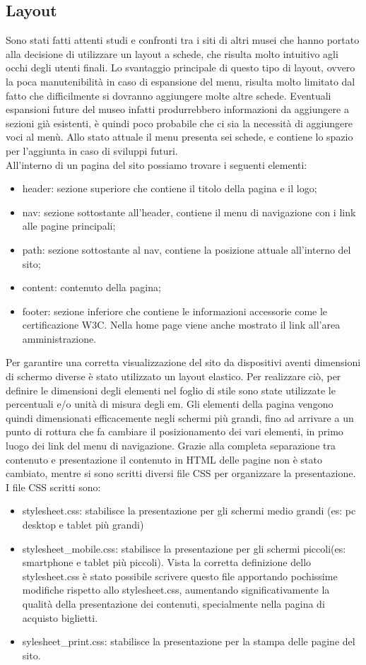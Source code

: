 \documentclass[10pt,a4paper,onecolumn]{article}
\begin{document}
\subsection{Layout}
Sono stati fatti attenti studi e confronti tra i siti di altri musei che hanno portato alla decisione di utilizzare un layout a schede, che risulta molto intuitivo agli occhi degli utenti finali. Lo svantaggio principale di questo tipo di layout, ovvero la poca manutenibilità in caso di espansione del menu, risulta molto limitato dal fatto che difficilmente si dovranno aggiungere molte altre schede. Eventuali espansioni future del museo infatti produrrebbero informazioni da aggiungere a sezioni già esistenti, è quindi poco probabile che ci sia la necessità di aggiungere voci al menù. Allo stato attuale il menu presenta sei schede, e contiene lo spazio per l'aggiunta in caso di sviluppi futuri.\\
All'interno di un pagina del sito possiamo trovare i seguenti elementi:
\begin{itemize}
 \item header: sezione superiore che contiene il titolo della pagina e il logo;
 \item nav: sezione sottostante all'header, contiene il menu di navigazione con i link alle pagine principali;
 \item path: sezione sottostante al nav, contiene la posizione attuale all'interno del sito;
 \item content: contenuto della pagina;
 \item footer: sezione inferiore che contiene le informazioni accessorie come le certificazione W3C. Nella home page viene anche mostrato il link all'area amministrazione.
\end{itemize}
Per garantire una corretta visualizzazione del sito da dispositivi aventi dimensioni di schermo diverse è stato utilizzato un layout elastico.
Per realizzare ciò, per definire le dimensioni degli elementi nel foglio di stile sono state utilizzate le percentuali e/o unità di misura degli em. Gli elementi della pagina vengono quindi dimensionati efficacemente negli schermi più grandi, fino ad arrivare a un punto di rottura che fa cambiare il posizionamento dei vari elementi, in primo luogo dei link del menu di navigazione. Grazie alla completa separazione tra contenuto e presentazione il contenuto in HTML delle pagine non è stato cambiato, mentre si sono scritti diversi file CSS per organizzare la presentazione.
I file CSS scritti sono:
\begin{itemize}
    \item stylesheet.css:  stabilisce la presentazione per gli schermi medio grandi (es: pc desktop e tablet più grandi)
    \item stylesheet\_mobile.css: stabilisce la presentazione per gli schermi piccoli(es: smartphone e tablet più piccoli). Vista la corretta definizione dello stylesheet.css è stato possibile scrivere questo file apportando pochissime modifiche rispetto allo stylesheet.css, aumentando significativamente la qualità della presentazione dei contenuti, specialmente nella pagina di acquisto biglietti.
    \item sylesheet\_print.css: stabilisce la presentazione per la stampa delle pagine del sito.
\end{itemize}
\end{document}
